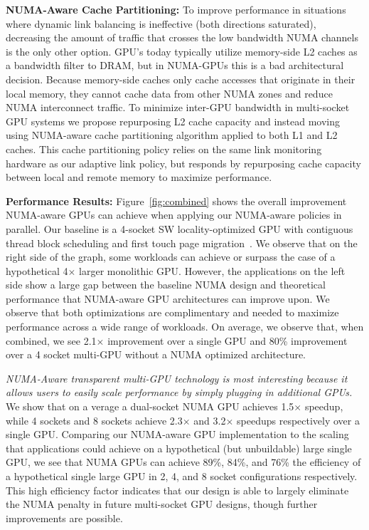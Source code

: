 \documentclass{sig-alternate}
\begin{document}
\textbf{NUMA-Aware Cache Partitioning:} To improve performance in situations 
where dynamic link balancing is ineffective (both directions saturated), 
decreasing the amount of traffic that crosses the low bandwidth NUMA channels is 
the only other option. GPU's today typically utilize memory-side L2 caches as a 
bandwidth filter to DRAM, but in NUMA-GPUs this is a bad architectural decision. 
Because memory-side caches only cache accesses that originate in their local 
memory, they cannot cache data from other NUMA zones and reduce NUMA 
interconnect traffic. To minimize inter-GPU bandwidth in multi-socket GPU 
systems we propose repurposing L2 cache capacity and instead moving using 
NUMA-aware cache partitioning algorithm applied to both L1 and L2 caches. This 
cache partitioning policy relies on the same link monitoring hardware as our 
adaptive link policy, but responds by repurposing cache capacity between local 
and remote memory to maximize performance.

\textbf{Performance Results: }Figure~\ref{fig:combined} shows the overall 
improvement NUMA-aware GPUs can achieve when applying our NUMA-aware policies in 
parallel. Our baseline is a 4-socket SW locality-optimized GPU with contiguous 
thread block scheduling and first touch page migration~\cite{Arunkumar2017}. We 
observe that on the right side of the graph, some workloads can achieve or 
surpass the case of a hypothetical 4$\times$ larger monolithic GPU. However, the 
applications on the left side show a large gap between the baseline NUMA design 
and theoretical performance that NUMA-aware GPU architectures can improve upon.  
We observe that both optimizations are complimentary and needed to maximize 
performance across a wide range of workloads. On average, we observe that, when 
combined, we see 2.1$\times$ improvement over a single GPU and 80\% improvement 
over a 4 socket multi-GPU without a NUMA optimized architecture.

\textit{NUMA-Aware transparent multi-GPU technology is most interesting because 
it allows users to easily scale performance by simply plugging in additional 
GPUs.} We show that on a verage a dual-socket NUMA GPU achieves 1.5$\times$ 
speedup, while 4 sockets and 8 sockets achieve 2.3$\times$ and 3.2$\times$ 
speedups respectively over a single GPU. Comparing our NUMA-aware GPU 
implementation to the scaling that applications could achieve on a hypothetical 
(but unbuildable) large single GPU, we see that NUMA GPUs can achieve 89\%, 
84\%, and 76\% the efficiency of a hypothetical single large GPU in 2, 4, and 8 
socket configurations respectively. This high efficiency factor indicates that 
our design is able to largely eliminate the NUMA penalty in future multi-socket 
GPU designs, though further improvements are possible.
\end{document}
